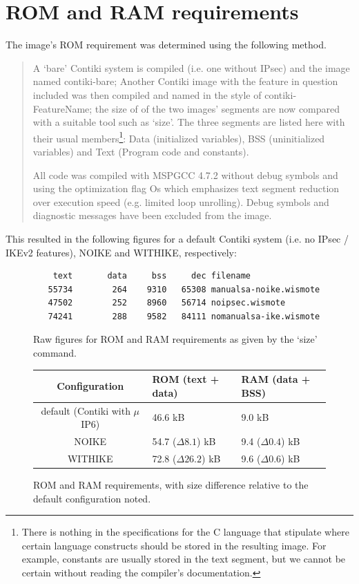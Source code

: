 \documentclass[final,a4paper,twoside,11pt,onecolumn]{report}
\begin{document}
\section{ROM and RAM requirements}
\label{imagecomp}
The image's ROM requirement was determined using the following method.

\begin{quotation}
A `bare' Contiki system is compiled (i.e. one without IPsec) and the image named contiki-bare; Another Contiki image with the feature in question included was then compiled and named in the style of contiki-FeatureName; the size of of the two images' segments are now compared with a suitable tool such as `size'. The three segments are listed here with their usual members\footnote{There is nothing in the specifications for the C language that stipulate where certain language constructs should be stored in the resulting image. For example, constants are usually stored in the text segment, but we cannot be certain without reading the compiler's documentation.}: Data (initialized variables), BSS (uninitialized variables) and Text (Program code and constants).

All code was compiled with MSPGCC 4.7.2 without debug symbols and using the optimization flag Os which emphasizes text segment reduction over execution speed (e.g. limited loop unrolling). Debug symbols and diagnostic messages have been excluded from the image.
\end{quotation}

This resulted in the following figures for a default Contiki system (i.e. no IPsec / IKEv2 features), NOIKE and WITHIKE, respectively:

\begin{figure}[h]
\begin{verbatim}
    text	   data	    bss	    dec	filename
   55734	    264	   9310	  65308	manualsa-noike.wismote
   47502	    252	   8960	  56714	noipsec.wismote
   74241	    288	   9582	  84111	nomanualsa-ike.wismote
\end{verbatim}
\caption{Raw figures for ROM and RAM requirements as given by the `size' command.}
\end{figure}



\begin{figure}[h]
\begin{tabular}{c|l|l}
Configuration                          & ROM (text + data)        & RAM (data + BSS)            \\ \hline
default (Contiki with $\mu$IP6)        & 46.6 kB                  & 9.0 kB                      \\
NOIKE                                  & 54.7 ($\Delta8.1$) kB    & 9.4 ($\Delta0.4$) kB        \\
WITHIKE                                & 72.8 ($\Delta26.2$) kB   & 9.6 ($\Delta0.6$) kB
\end{tabular}
\label{tab:rom-ram-eval}
\caption{ROM and RAM requirements, with size difference relative to the default configuration noted.}
\end{figure}
\end{document}
